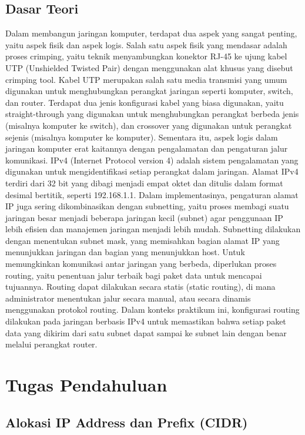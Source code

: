 \subsection{Dasar Teori}
Dalam membangun jaringan komputer, terdapat dua aspek yang sangat penting, yaitu aspek fisik dan aspek logis. Salah satu aspek fisik yang mendasar adalah proses crimping, yaitu teknik menyambungkan konektor RJ-45 ke ujung kabel UTP (Unshielded Twisted Pair) dengan menggunakan alat khusus yang disebut crimping tool. Kabel UTP merupakan salah satu media transmisi yang umum digunakan untuk menghubungkan perangkat jaringan seperti komputer, switch, dan router. Terdapat dua jenis konfigurasi kabel yang biasa digunakan, yaitu straight-through yang digunakan untuk menghubungkan perangkat berbeda jenis (misalnya komputer ke switch), dan crossover yang digunakan untuk perangkat sejenis (misalnya komputer ke komputer). Sementara itu, aspek logis dalam jaringan komputer erat kaitannya dengan pengalamatan dan pengaturan jalur komunikasi. IPv4 (Internet Protocol version 4) adalah sistem pengalamatan yang digunakan untuk mengidentifikasi setiap perangkat dalam jaringan. Alamat IPv4 terdiri dari 32 bit yang dibagi menjadi empat oktet dan ditulis dalam format desimal bertitik, seperti 192.168.1.1. Dalam implementasinya, pengaturan alamat IP juga sering dikombinasikan dengan subnetting, yaitu proses membagi suatu jaringan besar menjadi beberapa jaringan kecil (subnet) agar penggunaan IP lebih efisien dan manajemen jaringan menjadi lebih mudah. Subnetting dilakukan dengan menentukan subnet mask, yang memisahkan bagian alamat IP yang menunjukkan jaringan dan bagian yang menunjukkan host. Untuk memungkinkan komunikasi antar jaringan yang berbeda, diperlukan proses routing, yaitu penentuan jalur terbaik bagi paket data untuk mencapai tujuannya. Routing dapat dilakukan secara statis (static routing), di mana administrator menentukan jalur secara manual, atau secara dinamis menggunakan protokol routing. Dalam konteks praktikum ini, konfigurasi routing dilakukan pada jaringan berbasis IPv4 untuk memastikan bahwa setiap paket data yang dikirim dari satu subnet dapat sampai ke subnet lain dengan benar melalui perangkat router.

\section{Tugas Pendahuluan}
\subsection{Alokasi IP Address dan Prefix (CIDR)}

